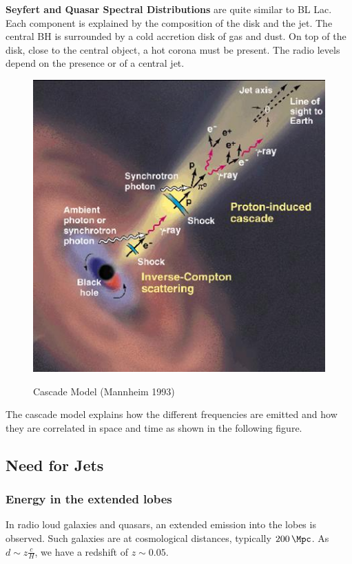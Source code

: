 \documentclass[10pt,a4paper,english]{article}
\begin{document}
\textbf{Seyfert and Quasar Spectral Distributions} are quite similar to BL Lac.
Each component is explained by the composition of the disk and the jet. The
central BH is surrounded by a cold accretion disk of gas and dust. On top of
the disk, close to the central object, a hot corona must be present. The radio
levels depend on the presence or of a central jet.
\begin{figure}[!ht]
  \begin{center}
    \includegraphics{figures/Mannheim1993.jpg}
    \label{fig:mannheim1993}
    \caption{Cascade Model (Mannheim 1993)}
  \end{center}
\end{figure}

The cascade model explains how the different frequencies are emitted and how
they are correlated in space and time as shown in the following figure.

\subsection{Need for Jets}

\subsubsection{Energy in the extended lobes}

In radio loud galaxies and quasars, an extended emission into the lobes is
observed. Such galaxies are at cosmological distances, typically
$\SI{200}{\Mpc}$. As $d\sim z\frac{c }{H}$, we have a redshift of $z\sim 0.05$.
\end{document}
